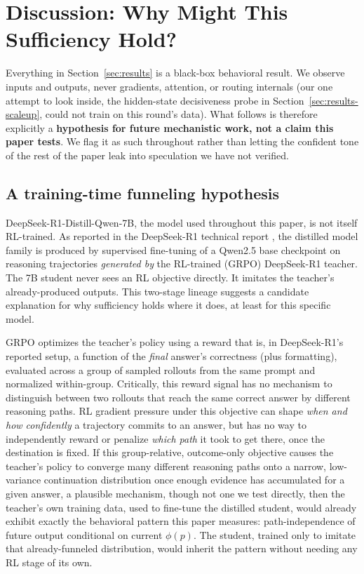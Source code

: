 \documentclass{article}
\begin{document}
\section{Discussion: Why Might This Sufficiency Hold?}
\label{sec:discussion}

Everything in Section~\ref{sec:results} is a black-box behavioral result. We observe inputs and outputs, never gradients, attention, or routing internals (our one attempt to look inside, the hidden-state decisiveness probe in Section~\ref{sec:results-scaleup}, could not train on this round's data). What follows is therefore explicitly a \textbf{hypothesis for future mechanistic work, not a claim this paper tests}. We flag it as such throughout rather than letting the confident tone of the rest of the paper leak into speculation we have not verified.

\subsection{A training-time funneling hypothesis}
\label{sec:discussion-funnel}

DeepSeek-R1-Distill-Qwen-7B, the model used throughout this paper, is not itself RL-trained. As reported in the DeepSeek-R1 technical report \citep{deepseekr1_2025}, the distilled model family is produced by supervised fine-tuning of a Qwen2.5 base checkpoint on reasoning trajectories \emph{generated by} the RL-trained (GRPO) DeepSeek-R1 teacher. The 7B student never sees an RL objective directly. It imitates the teacher's already-produced outputs. This two-stage lineage suggests a candidate explanation for why sufficiency holds where it does, at least for this specific model.

GRPO optimizes the teacher's policy using a reward that is, in DeepSeek-R1's reported setup, a function of the \emph{final} answer's correctness (plus formatting), evaluated across a group of sampled rollouts from the same prompt and normalized within-group. Critically, this reward signal has no mechanism to distinguish between two rollouts that reach the same correct answer by different reasoning paths. RL gradient pressure under this objective can shape \emph{when and how confidently} a trajectory commits to an answer, but has no way to independently reward or penalize \emph{which path} it took to get there, once the destination is fixed. If this group-relative, outcome-only objective causes the teacher's policy to converge many different reasoning paths onto a narrow, low-variance continuation distribution once enough evidence has accumulated for a given answer, a plausible mechanism, though not one we test directly, then the teacher's own training data, used to fine-tune the distilled student, would already exhibit exactly the behavioral pattern this paper measures: path-independence of future output conditional on current $\phi(p)$. The student, trained only to imitate that already-funneled distribution, would inherit the pattern without needing any RL stage of its own.
\end{document}
